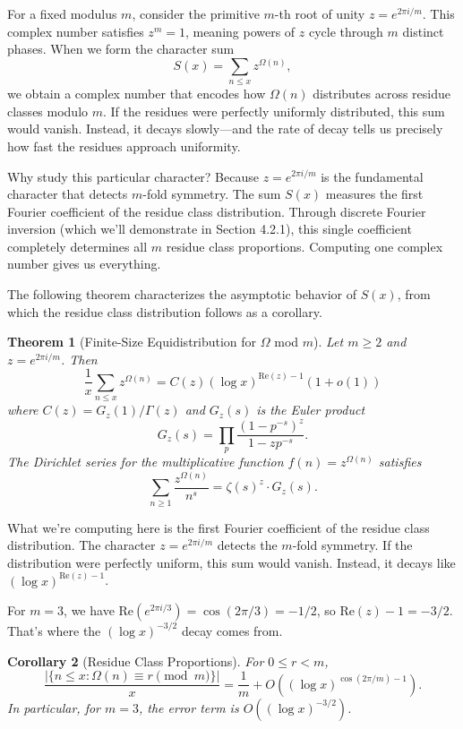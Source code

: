 \documentclass[12pt]{article}
\newtheorem{theorem}{Theorem}[section]
\newtheorem{corollary}[theorem]{Corollary}
\theoremstyle{definition}
\theoremstyle{remark}
\begin{document}
For a fixed modulus $m$, consider the primitive $m$-th root of unity $z = e^{2\pi i/m}$. This complex number satisfies $z^m = 1$, meaning powers of $z$ cycle through $m$ distinct phases. When we form the character sum
\[
S(x) = \sum_{n \leq x} z^{\Omega(n)},
\]
we obtain a complex number that encodes how $\Omega(n)$ distributes across residue classes modulo $m$. If the residues were perfectly uniformly distributed, this sum would vanish. Instead, it decays slowly—and the rate of decay tells us precisely how fast the residues approach uniformity.

Why study this particular character? Because $z = e^{2\pi i/m}$ is the fundamental character that detects $m$-fold symmetry. The sum $S(x)$ measures the first Fourier coefficient of the residue class distribution. Through discrete Fourier inversion (which we'll demonstrate in Section 4.2.1), this single coefficient completely determines all $m$ residue class proportions. Computing one complex number gives us everything.

The following theorem characterizes the asymptotic behavior of $S(x)$, from which the residue class distribution follows as a corollary.

\begin{theorem}[Finite-Size Equidistribution for $\Omega$ mod $m$]\label{thm:main}
Let $m \geq 2$ and $z = e^{2\pi i/m}$. Then
\[
\frac{1}{x}\sum_{n \leq x} z^{\Omega(n)} = C(z) (\log x)^{\mathrm{Re}(z) - 1}(1 + o(1))
\]
where $C(z) = G_z(1)/\Gamma(z)$ and $G_z(s)$ is the Euler product
\[
G_z(s) = \prod_{p} \frac{(1 - p^{-s})^z}{1 - zp^{-s}}.
\]
The Dirichlet series for the multiplicative function $f(n) = z^{\Omega(n)}$ satisfies
\[
\sum_{n \geq 1}\frac{z^{\Omega(n)}}{n^s} = \zeta(s)^z \cdot G_z(s).
\]
\end{theorem}

What we're computing here is the first Fourier coefficient of the residue class distribution. The character $z = e^{2\pi i/m}$ detects the $m$-fold symmetry. If the distribution were perfectly uniform, this sum would vanish. Instead, it decays like $(\log x)^{\mathrm{Re}(z) - 1}$.

For $m = 3$, we have $\mathrm{Re}(e^{2\pi i/3}) = \cos(2\pi/3) = -1/2$, so $\mathrm{Re}(z) - 1 = -3/2$. That's where the $(\log x)^{-3/2}$ decay comes from.

\begin{corollary}[Residue Class Proportions]
For $0 \leq r < m$,
\[
\frac{|\{n \leq x : \Omega(n) \equiv r \pmod{m}\}|}{x} = \frac{1}{m} + O\left((\log x)^{\cos(2\pi/m) - 1}\right).
\]
In particular, for $m = 3$, the error term is $O((\log x)^{-3/2})$.
\end{corollary}
\end{document}

